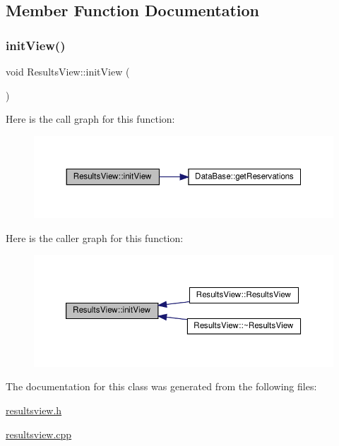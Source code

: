 \subsection{Member Function Documentation}
\mbox{\label{class_results_view_ad21cd6811c5b0e4d862563962fbe09d3}} 
\subsubsection{\texorpdfstring{init\+View()}{initView()}}
{\footnotesize\ttfamily void Results\+View\+::init\+View (\begin{DoxyParamCaption}{ }\end{DoxyParamCaption})}

Here is the call graph for this function\+:\nopagebreak
\begin{figure}[H]
\begin{center}
\leavevmode
\includegraphics[width=350pt]{class_results_view_ad21cd6811c5b0e4d862563962fbe09d3_cgraph}
\end{center}
\end{figure}
Here is the caller graph for this function\+:\nopagebreak
\begin{figure}[H]
\begin{center}
\leavevmode
\includegraphics[width=350pt]{class_results_view_ad21cd6811c5b0e4d862563962fbe09d3_icgraph}
\end{center}
\end{figure}


The documentation for this class was generated from the following files\+:\begin{DoxyCompactItemize}
\item 
\hyperlink{resultsview_8h}{resultsview.\+h}\item 
\hyperlink{resultsview_8cpp}{resultsview.\+cpp}\end{DoxyCompactItemize}
